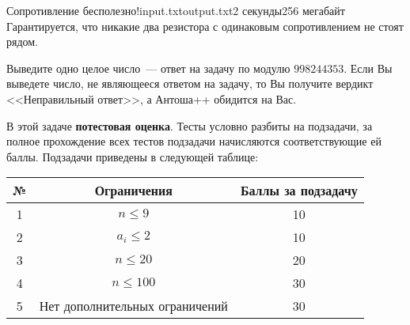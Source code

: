 \begin{problem}{Сопротивление бесполезно!}{input.txt}{output.txt}{2 секунды}{256 мегабайт}
Гарантируется, что никакие два резистора с одинаковым сопротивлением не стоят рядом.

\OutputFile

Выведите одно целое число~--- ответ на задачу по модулю $998244353$. Если Вы выведете число, не являющееся ответом на задачу, то Вы получите вердикт <<Неправильный ответ>>, а Антоша++ обидится на Вас.

\Examples

\begin{example}
%
%
%
%
\end{example}

\Scoring

В этой задаче \textbf{потестовая оценка}. Тесты условно разбиты на подзадачи, за полное прохождение всех тестов подзадачи начисляются соответствующие ей баллы. Подзадачи приведены в следующей таблице:

\medskip

\begin{tabular}{| c | c | c |} \hline
	№ & Ограничения & Баллы за подзадачу \\ \hline
	1 & $n \le 9$ & 10 \\ \hline
	2 & $a_i \le 2$ & 10 \\ \hline
	3 & $n \le 20$ & 20 \\ \hline
	4 & $n \le 100$ & 30 \\ \hline
	5 & Нет дополнительных ограничений & 30 \\ \hline
\end{tabular}

\end{problem}

